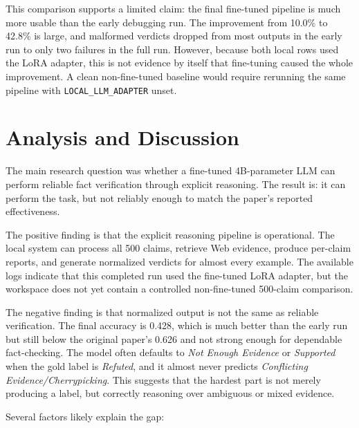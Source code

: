 \documentclass[11pt]{article}
\begin{document}
This comparison supports a limited claim: the final fine-tuned pipeline is much more usable than the early debugging run. The improvement from 10.0\% to 42.8\% is large, and malformed verdicts dropped from most outputs in the early run to only two failures in the full run. However, because both local rows used the LoRA adapter, this is not evidence by itself that fine-tuning caused the whole improvement. A clean non-fine-tuned baseline would require rerunning the same pipeline with \texttt{LOCAL\_LLM\_ADAPTER} unset.

\section*{Analysis and Discussion}
The main research question was whether a fine-tuned 4B-parameter LLM can perform reliable fact verification through explicit reasoning. The result is: it can perform the task, but not reliably enough to match the paper's reported effectiveness.

The positive finding is that the explicit reasoning pipeline is operational. The local system can process all 500 claims, retrieve Web evidence, produce per-claim reports, and generate normalized verdicts for almost every example. The available logs indicate that this completed run used the fine-tuned LoRA adapter, but the workspace does not yet contain a controlled non-fine-tuned 500-claim comparison.

The negative finding is that normalized output is not the same as reliable verification. The final accuracy is 0.428, which is much better than the early run but still below the original paper's 0.626 and not strong enough for dependable fact-checking. The model often defaults to \textit{Not Enough Evidence} or \textit{Supported} when the gold label is \textit{Refuted}, and it almost never predicts \textit{Conflicting Evidence/Cherrypicking}. This suggests that the hardest part is not merely producing a label, but correctly reasoning over ambiguous or mixed evidence.

Several factors likely explain the gap:
\end{document}
